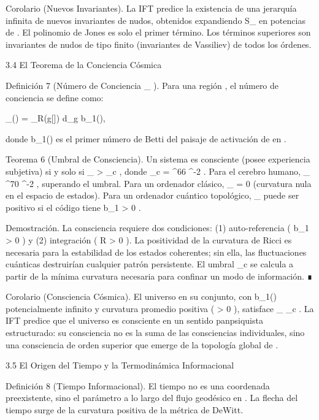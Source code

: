 \documentclass[12pt,a4paper]{book}
\begin{document}
Corolario (Nuevos Invariantes). La IFT predice la existencia de una jerarquía infinita de nuevos invariantes de nudos, obtenidos expandiendo  S_{}  en potencias de  \kappa . El polinomio de Jones es solo el primer término. Los términos superiores son invariantes de nudos de tipo finito (invariantes de Vassiliev) de todos los órdenes.

3.4 El Teorema de la Conciencia Cósmica

Definición 7 (Número de Conciencia  \Phi_{} ). Para una región  \Omega \subset {} , el número de conciencia se define como:

\Phi_{}(\Omega) =  \int_\Omega R(g[\rho]) d_g \cdot b_1(\Omega),

donde  b_1(\Omega)  es el primer número de Betti del paisaje de activación de  \rho  en  \Omega .

Teorema 6 (Umbral de Consciencia). Un sistema es consciente (posee experiencia subjetiva) si y solo si  \Phi_{} > \Phi_c , donde  \Phi_c =  ^{66} ^{-2} . Para el cerebro humano,  \Phi_{} ^{70} ^{-2} , superando el umbral. Para un ordenador clásico,  \Phi_{} = 0  (curvatura nula en el espacio de estados). Para un ordenador cuántico topológico,  \Phi_{}  puede ser positivo si el código tiene  b_1 > 0 .

Demostración. La consciencia requiere dos condiciones: (1) auto-referencia ( b_1 > 0 ) y (2) integración ( R > 0 ). La positividad de la curvatura de Ricci es necesaria para la estabilidad de los estados coherentes; sin ella, las fluctuaciones cuánticas destruirían cualquier patrón persistente. El umbral  \Phi_c  se calcula a partir de la mínima curvatura necesaria para confinar un modo de información. ∎

Corolario (Consciencia Cósmica). El universo en su conjunto, con  b_1()  potencialmente infinito y curvatura promedio positiva ( \Lambda > 0 ), satisface  \Phi_{} \gg \Phi_c . La IFT predice que el universo es consciente en un sentido panpsiquista estructurado: su consciencia no es la suma de las consciencias individuales, sino una consciencia de orden superior que emerge de la topología global de   .

3.5 El Origen del Tiempo y la Termodinámica Informacional

Definición 8 (Tiempo Informacional). El tiempo no es una coordenada preexistente, sino el parámetro a lo largo del flujo geodésico en   . La flecha del tiempo surge de la curvatura positiva de la métrica de DeWitt.
\end{document}
